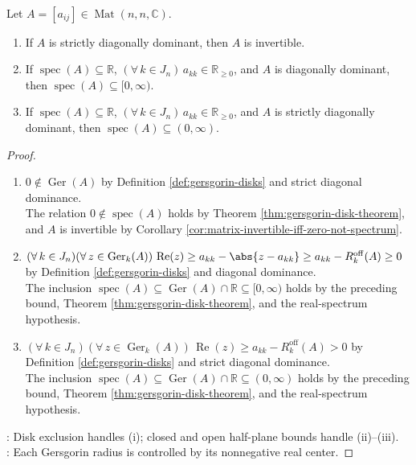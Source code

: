 \begin{corollary} \label{cor:strict-diagonal-dominance-invertible} \\
Let $A=[a_{ij}]\in\operatorname{Mat}(n,n,\mathbb{C})$.
\begin{enumerate}[label=(\roman*)]
\setlength{\itemsep}{0pt}
\item If $A$ is strictly diagonally dominant, then $A$ is invertible.
\item If $\operatorname{spec}(A)\subseteq\mathbb{R}$, $(\forall\,k\in J_n)\,a_{kk}\in\mathbb{R}_{\geq0}$, and $A$ is diagonally dominant, then $\operatorname{spec}(A)\subseteq[0,\infty)$.
\item If $\operatorname{spec}(A)\subseteq\mathbb{R}$, $(\forall\,k\in J_n)\,a_{kk}\in\mathbb{R}_{\geq0}$, and $A$ is strictly diagonally dominant, then $\operatorname{spec}(A)\subseteq(0,\infty)$.
\end{enumerate}
\begin{proof}
\begin{enumerate}[label=(\roman*)]
\setlength{\itemsep}{0pt}
\item $0\notin\operatorname{Ger}(A)$ by Definition \ref{def:gersgorin-disks} and strict diagonal dominance.\\
The relation $0\notin\operatorname{spec}(A)$ holds by Theorem \ref{thm:gersgorin-disk-theorem}, and $A$ is invertible by Corollary \ref{cor:matrix-invertible-iff-zero-not-spectrum}.
\item $(\forall\,k\in J_n)(\forall\,z\in\operatorname{Ger}_k(A))\,\operatorname{Re}(z)\geq a_{kk}-\abs{z-a_{kk}}\geq a_{kk}-R_k^{\mathrm{off}}(A)\geq0$ by Definition \ref{def:gersgorin-disks} and diagonal dominance.\\
The inclusion $\operatorname{spec}(A)\subseteq\operatorname{Ger}(A)\cap\mathbb{R}\subseteq[0,\infty)$ holds by the preceding bound, Theorem \ref{thm:gersgorin-disk-theorem}, and the real-spectrum hypothesis.
\item $(\forall\,k\in J_n)(\forall\,z\in\operatorname{Ger}_k(A))\,\operatorname{Re}(z)\geq a_{kk}-R_k^{\mathrm{off}}(A)>0$ by Definition \ref{def:gersgorin-disks} and strict diagonal dominance.\\
The inclusion $\operatorname{spec}(A)\subseteq\operatorname{Ger}(A)\cap\mathbb{R}\subseteq(0,\infty)$ holds by the preceding bound, Theorem \ref{thm:gersgorin-disk-theorem}, and the real-spectrum hypothesis.
\end{enumerate}
: Disk exclusion handles (i); closed and open half-plane bounds handle (ii)--(iii).\\
: Each Gersgorin radius is controlled by its nonnegative real center.
\end{proof}
\end{corollary}

